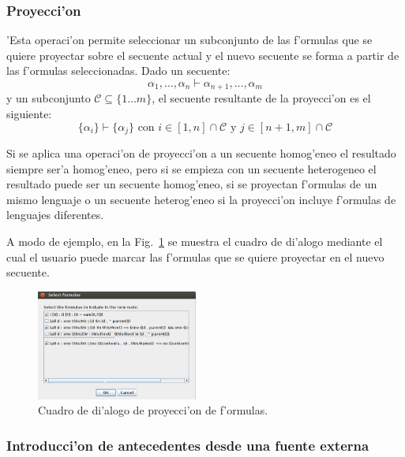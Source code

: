 \subsubsection{Proyecci'on}

'Esta operaci'on  permite seleccionar un subconjunto de las f'ormulas que se quiere proyectar sobre el secuente actual y el nuevo secuente se forma a partir de las f'ormulas seleccionadas.
Dado un secuente: $$ \alpha_1,\ldots,\alpha_n \vdash \alpha_{n+1},\ldots,\alpha_m $$
y un subconjunto $\mathcal{C} \subseteq \{1 \ldots m\}$, el secuente resultante de la proyecci'on es el siguiente:
$$\{\alpha_i \} \vdash \{\alpha_j\} \mbox{ con }i\in [1,n]\cap\mathcal{C} \mbox{ y } j\in [n+1, m]\cap\mathcal{C}$$

Si se aplica una operaci'on de proyecci'on a un secuente homog'eneo el resultado siempre ser'a homog'eneo, pero si se empieza con un secuente heterogeneo el resultado puede ser un secuente homog'eneo, si se proyectan f'ormulas de un mismo lenguaje o un secuente heterog'eneo si la proyecci'on incluye f'ormulas de lenguajes diferentes.

A modo de ejemplo, en la Fig.~\ref{seq selection} se muestra el cuadro de di'alogo mediante el cual el usuario puede marcar las f'ormulas que se quiere proyectar en el nuevo secuente.

\begin{figure}[tb]
	\includegraphics[width=200px]{img/select.png}
	\centering
	\caption{Cuadro de di'alogo de proyecci'on de f'ormulas.}
        \label{seq selection}
\end{figure}

\subsubsection{Introducci'on de antecedentes desde una fuente externa}

